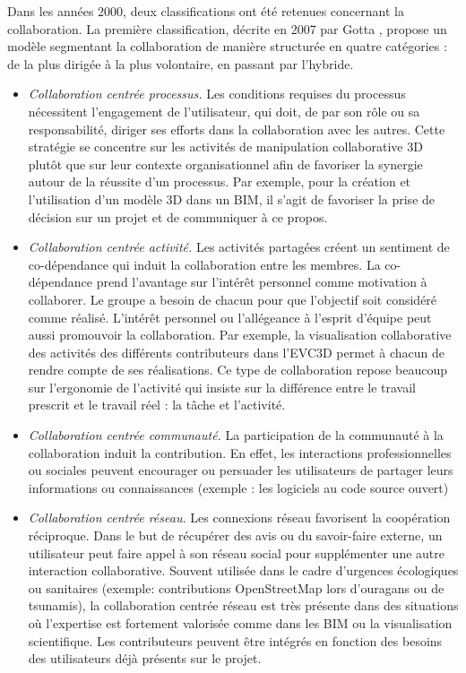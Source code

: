 Dans les années 2000, deux classifications ont été retenues concernant la 
collaboration.
La première classification, décrite en 2007 par Gotta \cite{Gotta2007}, propose 
un modèle segmentant la collaboration de manière structurée en quatre catégories 
: de la plus dirigée à la plus volontaire, en passant par l'hybride.
\begin{itemize}
	\item \textit{Collaboration centrée processus.} Les conditions requises du 
	processus 
	nécessitent l'engagement de l'utilisateur, qui doit, de par son rôle ou sa 
	responsabilité, diriger ses efforts dans la collaboration avec les autres. Cette 
	stratégie se concentre sur les activités de manipulation collaborative \gls{3D} 
	plutôt 
	que sur leur contexte organisationnel afin de favoriser la synergie autour de la 
	réussite d'un processus. Par exemple, pour la création et l'utilisation d'un 
	modèle 	3D dans un \gls{BIM}, il s'agit de favoriser la prise de décision sur un 
	projet et de communiquer à ce propos.
	
	\item \textit{Collaboration centrée activité.}
	Les activités partagées créent un sentiment de co-dé\-pendance qui induit la 
	collaboration entre les membres. La co-dépendance prend l'avantage sur l'intérêt personnel comme motivation à collaborer. Le groupe a besoin 
	de chacun pour que l'objectif soit considéré comme réalisé. L'intérêt personnel 
	ou l'allégeance à l'esprit d'équipe peut aussi promouvoir la collaboration. Par 
	exemple, la visualisation collaborative des activités des différents contributeurs 
	dans l'\gls{EVC3D} permet à chacun de rendre compte de ses réalisations. Ce 
	type de collaboration repose beaucoup sur l'ergonomie de l'activité qui insiste sur la 
	différence entre le travail prescrit et le travail réel : la tâche et l'activité.
	
	\item \textit{Collaboration centrée communauté.}
	La participation de la communauté à la collaboration induit la contribution. En 
	effet, les interactions professionnelles ou sociales peuvent encourager ou 
	persuader les utilisateurs de partager leurs informations ou connaissances 
	(exemple : les logiciels au code source ouvert)
	
	\item \textit{Collaboration centrée réseau.}
	Les connexions réseau favorisent la coopération réciproque. Dans le but de 
	récupérer des avis ou du savoir-faire externe, un utilisateur peut faire appel à 
	son réseau social pour supplémenter une autre interaction collaborative. 
	Souvent utilisée dans le cadre d'urgences écologiques ou sanitaires (exemple: 
	contributions OpenStreetMap lors d'ouragans ou de tsunamis), la collaboration 
	centrée réseau est très présente dans des situations où l'expertise est 
	fortement 
	valorisée comme dans les \gls{BIM} ou la visualisation scientifique. Les 
	contributeurs peuvent être intégrés en fonction des besoins des utilisateurs déjà 
	présents sur le projet.
\end{itemize}

